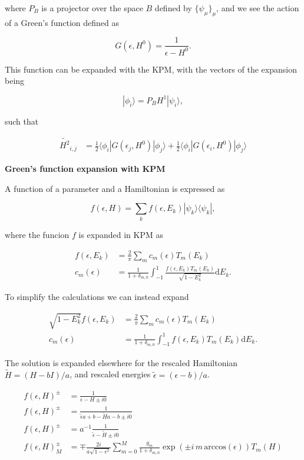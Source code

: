 \documentclass[10pt, onecolumn, aps, prb, superscriptaddress, floatfix, showpacs, notitlepage]{revtex4-1}
\newcommand{\bra}[1]{\langle #1|}
\newcommand{\ket}[1]{|#1\rangle}
\begin{document}
where $P_B$ is a projector over the space $B$ defined by $\{\psi_\mu\}_\mu$,
and we see the action of a Green's function defined as

$$
G(\epsilon, H^0) = \frac{1}{\epsilon-H^0}.
$$

This function can be expanded with the KPM, with the vectors of the expansion
being

$$
\ket{\phi_i} = P_B H^1\ket{\psi_i},
$$


such that


\begin{align}
\tilde{H^2}_{i,j} &= \frac{1}{2}
\bra{\phi_i} G(\epsilon_j, H^0) \ket{\phi_j}
+
\frac{1}{2}
\bra{\phi_i} G(\epsilon_i, H^0) \ket{\phi_j}
\end{align}

\textbf{Green's function expansion with KPM}

A function of a parameter and a Hamiltonian is expressed as 

$$
f(\epsilon, H) = \sum_k f(\epsilon, E_k) \ket{\psi_k}\bra{\psi_k},
$$

where the funcion $f$ is expanded in KPM as

\begin{align}
f(\epsilon, E_k) &= \frac{2}{\pi}\sum_m c_m(\epsilon)T_m(E_k)\\
c_m(\epsilon) &=\frac{1}{1+\delta_{m,0}}
\int_{-1}^1 \frac{f(\epsilon, E_k) T_m(E_k)}{\sqrt{1-E_k^2}}\mathrm{d}E_k.
\end{align}

To simplify the calculations we can instead expand

\begin{align}
\sqrt{1-E_k^2}f(\epsilon, E_k) &= \frac{2}{\pi}\sum_m c_m(\epsilon)T_m(E_k)\\
c_m(\epsilon) &=\frac{1}{1+\delta_{m,0}}
\int_{-1}^1 {f(\epsilon, E_k) T_m(E_k)}\mathrm{d}E_k.
\end{align}


The solution is expanded elsewhere\cite{Garcia2014} for the rescaled
Hamiltonian $\tilde{H}=(H-bI)/a$, and rescaled energies
$\tilde{\epsilon}=(\epsilon-b)/a$.

\begin{align}
f(\epsilon, H)^\pm &= \frac{1}{\epsilon-H \pm i0}\\
f(\epsilon, H)^\pm &= \frac{1}{\tilde{\epsilon}a+b-\tilde{H}a-b \pm i0}\\
f(\epsilon, H)^\pm &= a^{-1}\frac{1}{\tilde{\epsilon}-\tilde{H} \pm i0}\\
f(\epsilon, H)^\pm_M &= \mp \frac{2i}{a\sqrt{1-\epsilon^2}}
\sum_{m=0}^{M}\frac{g_m}{1+\delta_{m,0}}
\exp(\pm i\,m\,\mathrm{arccos}(\epsilon)) T_m(H)
\end{align}
\end{document}
